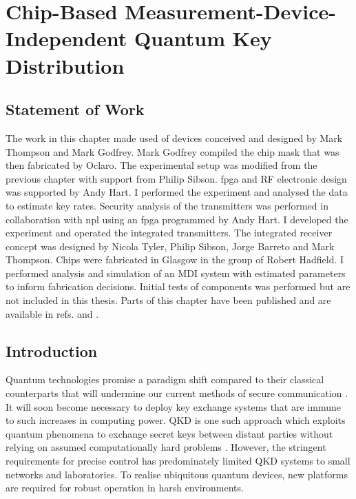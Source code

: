 %
%
\graphicspath{{./chapters/chapter04/fig04/}}

\let\textcircled=\pgftextcircled
\chapter[Chip-Based Measurement-Device-Independent QKD]{Chip-Based Measurement-Device-Independent Quantum Key Distribution}
\label{chap:mdiqkd}

\section*{Statement of Work}

The work in this chapter made used of devices conceived and designed by Mark Thompson and Mark Godfrey. Mark Godfrey compiled the chip mask that was then fabricated by Oclaro. The experimental setup was modified from the previous chapter with support from Philip Sibson. \ac{fpga} and RF electronic design was supported by Andy Hart. I performed the experiment and analysed the data to estimate key rates. Security analysis of the transmitters was performed in collaboration with \acl{npl} using an \acs{fpga} programmed by Andy Hart. I developed the experiment and operated the integrated transmitters. The integrated receiver concept was designed by Nicola Tyler, Philip Sibson, Jorge Barreto and Mark Thompson. Chips were fabricated in Glasgow in the group of Robert Hadfield. I performed analysis and simulation of an \ac{MDI} system with estimated parameters to inform fabrication decisions. Initial tests of components was performed but are not included in this thesis. Parts of this chapter have been published and are available in refs. \cite{semenenko2019mdi} and \cite{vaquero2018}.

\section{Introduction}

Quantum technologies promise a paradigm shift compared to their classical counterparts that will undermine our current methods of secure communication \cite{shor1994}. It will soon become necessary to deploy key exchange systems that are immune to such increases in computing power. \ac{QKD} is one such approach which exploits quantum phenomena to exchange secret keys between distant parties without relying on assumed computationally hard problems \cite{BB84, E91}. However, the stringent requirements for precise control has predominately limited \ac{QKD} systems to small networks and laboratories. To realise ubiquitous quantum devices, new platforms are required for robust operation in harsh environments. 

